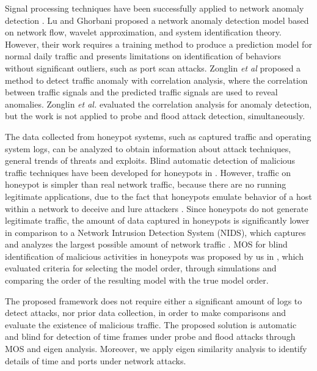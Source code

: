 \documentclass[review]{elsarticle}
\begin{document}
Signal processing techniques have been successfully applied to network anomaly detection \cite{Lu2009}. Lu and Ghorbani \cite{Lu2009} proposed a network anomaly detection model based on network flow, wavelet approximation, and system identification theory. However, their work requires a training method to produce a prediction model for normal daily traffic and presents limitations on identification of behaviors without significant outliers, such as port scan attacks. Zonglin \emph{et al} \cite{Zonglin2009} proposed a method to detect traffic anomaly with correlation analysis, where the correlation between traffic signals and the predicted traffic signals are used to reveal anomalies. Zonglin \emph{et al.} \cite{Zonglin2009} evaluated the correlation analysis for anomaly detection, but the work is not applied to probe and flood attack detection, simultaneously. 

The data collected from honeypot systems, such as captured traffic and operating system logs, can be analyzed to obtain information about attack techniques, general trends of threats and exploits. Blind automatic detection of malicious traffic techniques have been developed for honeypots in \cite{david2011blind,da2012improved}. However, traffic on honeypot is simpler than real network traffic, because there are no running legitimate applications, due to the fact that honeypots emulate behavior of a host within a network to deceive and lure attackers \cite{zakaria2012review}. Since honeypots do not generate legitimate traffic, the amount of data captured in honeypots is significantly lower in comparison to a Network Intrusion Detection System (NIDS), which captures and analyzes the largest possible amount of network traffic \cite{david2011blind}. MOS for blind identification of malicious activities in honeypots was proposed by us in \cite{david2011blind}, which evaluated criteria for selecting the model order, through simulations and comparing the order of the resulting model with the true model order.

The proposed framework does not require either a significant amount of logs to detect attacks, nor prior data collection, in order to make comparisons and evaluate the existence of malicious traffic. The proposed solution is automatic and blind for detection of time frames under probe and flood attacks through MOS and eigen analysis. Moreover, we apply eigen similarity analysis to identify details of time and ports under network attacks.
\end{document}
